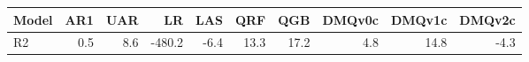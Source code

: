 \begin{tabular}{lrrrrrrrrr}
\toprule
Model & AR1 & UAR & LR & LAS & QRF & QGB & DMQv0c & DMQv1c & DMQv2c \\
\midrule
R2 & 0.5 & 8.6 & -480.2 & -6.4 & 13.3 & 17.2 & 4.8 & 14.8 & -4.3 \\
\bottomrule
\end{tabular}
